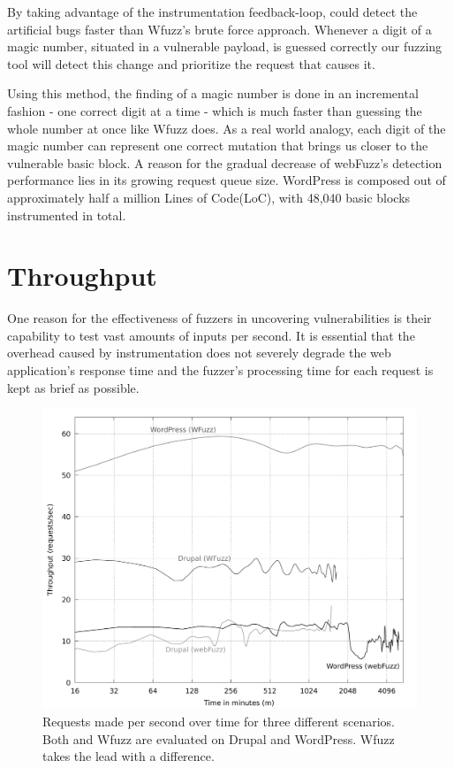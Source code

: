 By taking advantage of the instrumentation feedback-loop, \pname{} could detect the artificial bugs faster than Wfuzz's brute force approach. Whenever a digit of a magic
number, situated in a vulnerable payload, is guessed correctly our fuzzing tool will detect this change and prioritize the request that causes it. 

Using this method, the finding of a magic number is done in an incremental fashion - one correct digit at a time - which is much faster than guessing the whole number at once like Wfuzz does. As a real world analogy, each digit of the magic number can represent one correct mutation that brings us closer to the vulnerable basic block. A reason for the gradual decrease of webFuzz's detection performance lies in its growing request queue size. WordPress is composed out of approximately half a million Lines of Code(LoC), with 48,040 basic blocks instrumented in total.

\section{Throughput}
One reason for the effectiveness of fuzzers in uncovering vulnerabilities is their capability to test vast amounts of inputs per second. It is essential that the overhead caused by instrumentation does not severely degrade the web application's response time and the fuzzer's processing time for each request is kept as brief as possible.

\begin{figure}[!htb]
  \centering \includegraphics[width=\linewidth]{figures/plot_throughput.pdf}
  \caption{Requests made per second over time for three different scenarios. Both \pname{} and Wfuzz are evaluated on Drupal and WordPress. Wfuzz takes the lead with a difference.} 
  \label{fig:plot_throughput}
\end{figure}

